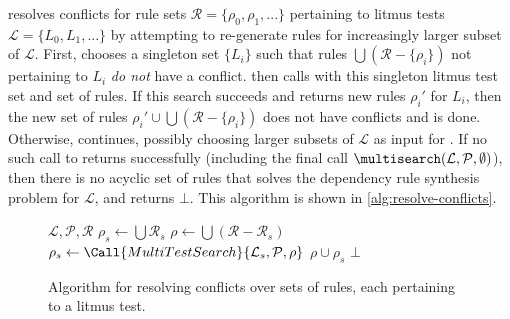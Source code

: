 \depsynth resolves conflicts for rule sets $\mathcal{R} = \{\rho_0, \rho_1, ...\}$ pertaining to litmus tests
$\mathcal{L} = \{L_0, L_1, ...\}$ by attempting to re-generate rules for increasingly larger subset of $\mathcal{L}$.
First, \resolvecons chooses a singleton set $\{L_i\}$ such that rules
$\bigcup (\mathcal{R} - \{\rho_i\})$ not pertaining to $L_i$ \textit{do not} have a conflict.
\resolvecons then calls \multisearch with this singleton litmus test set and set of rules.
If this search succeeds and returns new rules $\rho_i'$ for $L_i$, then the new set of rules
$\rho_i' \cup \bigcup (\mathcal{R} - \{\rho_i\})$ does not have conflicts and \resolvecons is done.
Otherwise, \resolvecons continues, possibly choosing larger subsets of $\mathcal{L}$ as
input for \multisearch. If no such call to \multisearch returns successfully (including the
final call $\multisearch(\mathcal{L}, \mathcal{P}, \emptyset)$), then there is no acyclic set
of rules that solves the dependency rule synthesis problem for $\mathcal{L}$, and \resolvecons
returns $\bot$. This algorithm is shown in \autoref{alg:resolve-conflicts}.

\begin{figure}[h]
\begin{algorithmic}[1]
    {$\mathcal{L}, \mathcal{P}, \mathcal{R}$}
        \State $\rho_s \gets \bigcup \mathcal{R}_s$
        \State $\rho \gets \bigcup (\mathcal{R} - \mathcal{R}_s)$
        \If{$\acyclic(\rho)$}
          \State $\rho_s \gets \Call{MultiTestSearch}{\mathcal{L}_s, \mathcal{P}, \rho}$
            \Return $\rho \cup \rho_s$
          \EndIf
        \EndIf
      \EndFor
    \EndFor
    \State \Return $\bot$
  \EndFunction
\end{algorithmic}
\caption{Algorithm for resolving conflicts over sets of rules, each pertaining to a litmus test.\tighten}
\label{alg:resolve-conflicts}
\end{figure}
